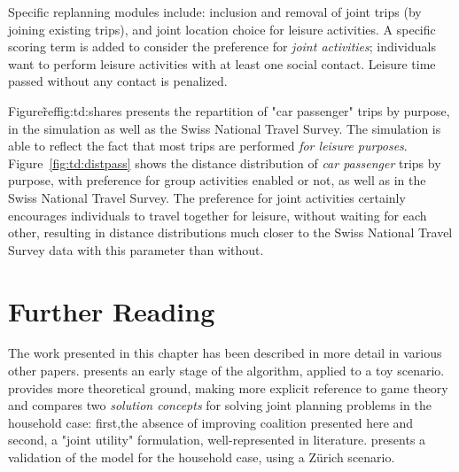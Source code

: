 {Specific replanning modules include: inclusion and removal of joint trips (by joining existing trips), and joint location choice for leisure activities. A specific scoring term is added to consider the preference for \emph{joint activities}; individuals want to perform leisure activities with at least one social contact. Leisure time passed without any contact is penalized.

Figure\~ref{fig:td:shares} presents the repartition of "car passenger" trips by purpose, in the simulation as well as the Swiss National Travel Survey. The simulation is able to reflect the fact that most trips are performed \emph{for leisure purposes}.
%
%
Figure~\ref{fig:td:distpass} shows the distance distribution of \emph{car passenger} trips by purpose, with preference for group activities enabled or not, as well as in the Swiss National Travel Survey. The preference for joint activities certainly encourages individuals to travel together for leisure, without waiting for each other, resulting in distance distributions much closer to the
Swiss National Travel Survey data with this parameter than without.


\section{Further Reading}
The work presented in this chapter has been described in more detail in various other papers. \citet{DubernetAxhausen_TransLett_2013} presents an early stage of the algorithm, applied to a toy scenario. \citet{DubernetAxhausen_STRC_2014} provides more theoretical ground, making more explicit reference to game theory and compares two \emph{solution concepts} for solving  joint planning problems in the household case: first,the absence of improving coalition presented here and second, a "joint utility" formulation, well-represented in literature. \citet{DubernetAxhausen_Transportation_forth} presents a validation of the model for the household case, using a Zürich scenario.

} %
